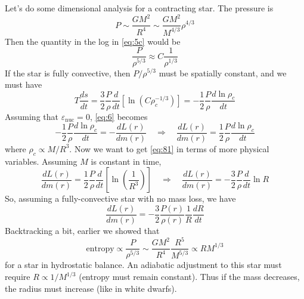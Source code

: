 \documentclass[10pt]{article}
\numberwithin{equation}{section}
\newcommand{\n}{\noindent}
\begin{document}
  \n Let's do some dimensional analysis for a contracting star. The
  pressure is
  \begin{equation}
    \label{eq:7}
    P\sim\frac{GM^2}{R^4}\sim\frac{GM^2}{M^{4/3}}\rho^{4/3}
  \end{equation}
  Then the quantity in the log in \eqref{eq:5c} would be
  \begin{equation}
    \label{eq:8}
    \frac{P}{\rho^{5/3}}\approx C\frac{1}{\rho^{1/3}}
  \end{equation}
  If the star is fully convective, then $P/\rho^{5/3}$ must be
  spatially constant, and we must have
  \begin{equation}
    \label{eq:80}
    T\frac{ds}{dt}=\frac{3}{2}\frac{P}{\rho}\frac{d}{dt}\left[\ln\left(C
\rho_c^{-1/3}\right)\right]=-\frac{1}{2}\frac{P}{\rho}\frac{d\ln\rho_c}{dt}
  \end{equation}
  Assuming that $\varepsilon_{\mathrm{nuc}}=0$, \eqref{eq:6} becomes
  \begin{equation}
    \label{eq:81}
    -\frac{1}{2}\frac{P}{\rho}\frac{d\ln\rho_c}{dt}=-\frac{dL(r)}{dm(r)}
\quad\Rightarrow\quad \frac{dL(r)}{dm(r)}=\frac{1}{2}\frac{P}{\rho}\frac{d
\ln\rho_c}{dt}
  \end{equation}
  where $\rho_c\propto M/R^3$. Now we want to get \eqref{eq:81} in
  terms of more physical variables. Assuming $M$ is constant in time,
  \begin{equation}
    \label{eq:82}
    \frac{dL(r)}{dm(r)}=\frac{1}{2}\frac{P}{\rho}\frac{d}{dt}\left[\ln\left
(\frac{1}{R^3}\right)\right]\quad\Rightarrow\quad
    \frac{dL(r)}{dm(r)}=-\frac{3}{2}\frac{P}{\rho}\frac{d}{dt}\ln R
  \end{equation}
  So, assuming a fully-convective star with no mass loss, we have
  \begin{equation}
    \label{eq:83}
    \boxed{\frac{dL(r)}{dm(r)}=-\frac{3}{2}\frac{P(r)}{\rho(r)}\frac{1}{R}
\frac{dR}{dt}}
  \end{equation}
  Backtracking a bit, earlier we showed that
  \begin{equation}
    \label{eq:84}
    \mathrm{entropy}\propto \frac{P}{\rho^{5/3}}\sim\frac{GM^2}{R^4}\frac
{R^5}{M^{5/3}}\propto RM^{1/3}
  \end{equation}
  for a star in hydrostatic balance. An adiabatic adjustment to this
  star must require $R\propto 1/M^{1/3}$ (entropy must remain
  constant). Thus if the mass decreases, the radius must increase
  (like in white dwarfs).\\
\end{document}
